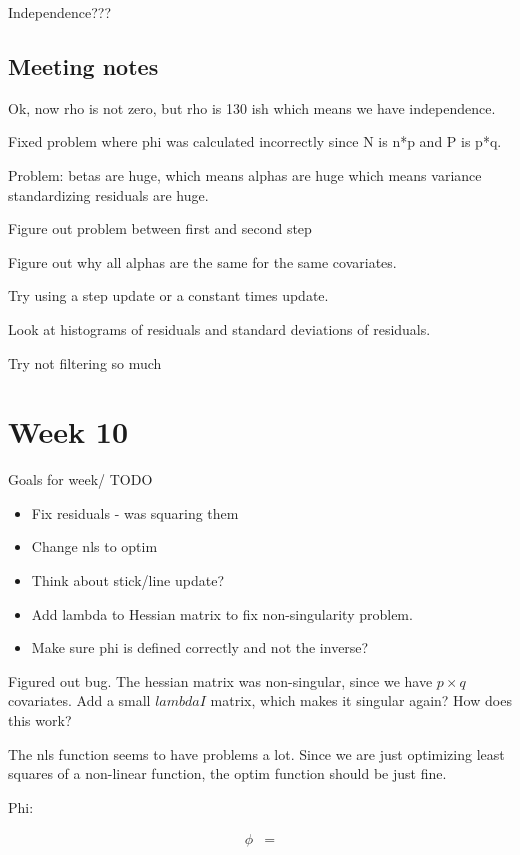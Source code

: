 \documentclass[10pt]{article}
\begin{document}
Independence???

\subsection{Meeting notes}

Ok, now rho is not zero, but rho is 130 ish which means we have independence.

Fixed problem where phi was calculated incorrectly since N is n*p and P is p*q.

Problem: betas are huge, which means alphas are huge which means variance standardizing residuals are huge.

Figure out problem between first and second step

Figure out why all alphas are the same for the same covariates.

Try using a step update or a constant times update.

Look at histograms of residuals and standard deviations of residuals.

Try not filtering so much

\section{Week 10}

Goals for week/ TODO
\begin{itemize}
  \item Fix residuals - was squaring them

  \item Change nls to optim
  \item Think about stick/line update?
  \item Add lambda to Hessian matrix to fix non-singularity problem.
  \item Make sure phi is defined correctly and not the inverse?
\end{itemize}

Figured out bug. The hessian matrix was non-singular, since we have $p \times q$ covariates. Add a small $lambda I$ matrix, which makes it singular again? How does this work?

The nls function seems to have problems a lot. Since we are just optimizing least squares of a non-linear function, the optim function should be just fine.

Phi:

\begin{align*}
  \phi &=
\end{align*}
\end{document}
